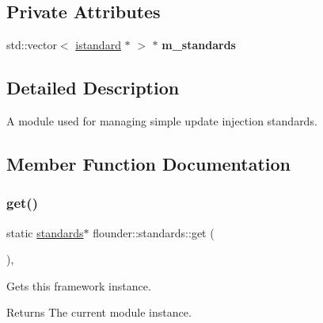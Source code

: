 \subsection*{Private Attributes}
\begin{DoxyCompactItemize}
\item 
\mbox{\label{classflounder_1_1standards_a022e3fe7bc232e076b6b2fe260f7cbde}} 
std\+::vector$<$ \hyperlink{classflounder_1_1istandard}{istandard} $\ast$ $>$ $\ast$ {\bfseries m\+\_\+standards}
\end{DoxyCompactItemize}


\subsection{Detailed Description}
A module used for managing simple update injection standards. 



\subsection{Member Function Documentation}
\mbox{\label{classflounder_1_1standards_af31cbc5c0616e052b210cc821ebdd8d5}} 
\subsubsection{\texorpdfstring{get()}{get()}}
{\footnotesize\ttfamily static \hyperlink{classflounder_1_1standards}{standards}$\ast$ flounder\+::standards\+::get (\begin{DoxyParamCaption}{ }\end{DoxyParamCaption})\hspace{0.3cm}{\ttfamily [inline]}, {\ttfamily [static]}}



Gets this framework instance. 

\begin{DoxyReturn}{Returns}
The current module instance. 
\end{DoxyReturn}
\mbox{\label{classflounder_1_1standards_a74dd1bd0e18bc72d985073a0771790fc}} 
